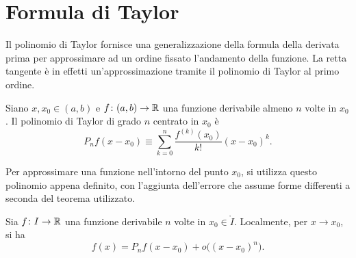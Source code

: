 \section{Formula di Taylor}
Il polinomio di Taylor fornisce una generalizzazione della formula della derivata prima per approssimare ad un ordine fissato l'andamento della funzione. La retta tangente è in effetti un'approssimazione tramite il polinomio di Taylor al primo ordine.
\begin{definizione}
\label{d:taylor}
Siano $x,x_0\in(a,b)$ e $f\colon(a,b)\to\mathbb{R}$ una funzione derivabile almeno $n$ volte in $x_0$. Il polinomio di Taylor di grado $n$ centrato in $x_0$ è
\begin{equation}
\label{eq:taylor}
P_nf(x-x_0)\equiv %
\sum_{k=0}^n\frac{f^{(k)}(x_0)}{k!}(x-x_0)^k.
\end{equation}
\end{definizione}
Per approssimare una funzione nell'intorno del punto $x_0$, si utilizza questo polinomio appena definito, con l'aggiunta dell'errore che assume forme differenti a seconda del teorema utilizzato.
\begin{teorema}
\label{t:taylor_peano}
Sia $f\colon I\to\mathbb{R}$ una funzione derivabile $n$ volte in $x_0\in\mathring{I}$. Localmente, per $x\to x_0$, si ha
\begin{equation}
\label{eq:taylor_peano}
f(x)=P_nf(x-x_0)+o\big((x-x_0)^n\big).
\end{equation}
\end{teorema}
